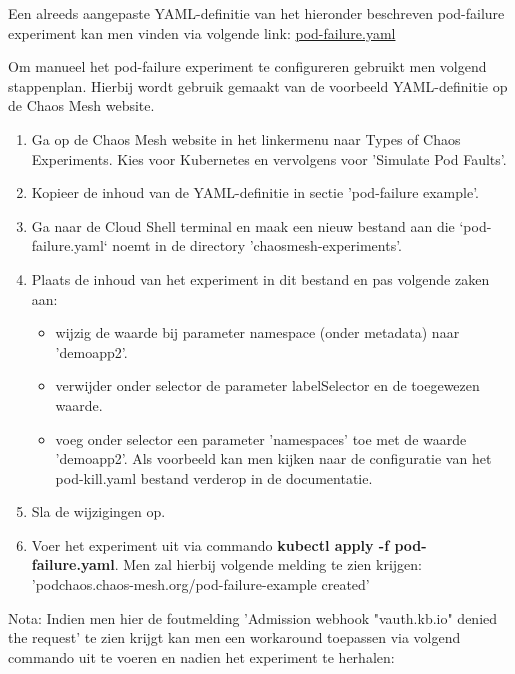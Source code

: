 Een alreeds aangepaste YAML-definitie van het hieronder beschreven pod-failure experiment kan men vinden via volgende link: \href{https://github.com/KenBruggeman/BP_21-22/blob/master/bachelorproef/docs/chaosmesh-experimenten/pod-failure.yaml}{pod-failure.yaml} 

Om manueel het pod-failure experiment te configureren gebruikt men volgend stappenplan. Hierbij wordt gebruik gemaakt van de voorbeeld YAML-definitie op de Chaos Mesh website.
\begin{enumerate}
    \item Ga op de Chaos Mesh website in het linkermenu naar Types of Chaos Experiments. Kies voor Kubernetes en vervolgens voor 'Simulate Pod Faults'.
    \item Kopieer de inhoud van de YAML-definitie in sectie 'pod-failure example'.
    \item Ga naar de Cloud Shell terminal en maak een nieuw bestand aan die `pod-failure.yaml` noemt in de directory 'chaosmesh-experiments'.
    \item Plaats de inhoud van het experiment in dit bestand en pas volgende zaken aan:
    \begin{itemize}
        \item wijzig de waarde bij parameter namespace (onder metadata) naar 'demoapp2'. 
        \item verwijder onder selector de parameter labelSelector en de toegewezen waarde.
        \item voeg onder selector een parameter 'namespaces' toe met de waarde 'demoapp2'. Als voorbeeld kan men kijken naar de configuratie van het pod-kill.yaml bestand verderop in de documentatie.
        \end{itemize} 
    \item Sla de wijzigingen op.
    \item Voer het experiment uit via commando {\bf kubectl apply -f pod-failure.yaml}. Men zal hierbij volgende melding te zien krijgen: 'podchaos.chaos-mesh.org/pod-failure-example created' 
\end{enumerate}

Nota: Indien men hier de foutmelding 'Admission webhook "vauth.kb.io" denied the request' te zien krijgt kan men een workaround toepassen via volgend commando uit te voeren en nadien het experiment te herhalen: \autocite{Keao2021} 
  

